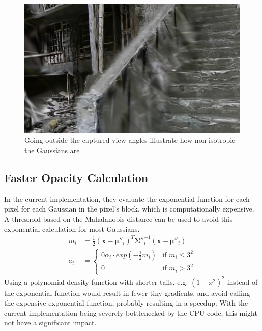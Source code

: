 \begin{figure}
    \centering
    \includegraphics[width=\linewidth]{images/very_isotropic.png}
    \caption{Going outside the captured view angles illustrate how non-isotropic the Gaussians are \cite{@nekoHashimaIslandCreated2023}}
    \label{fig:very_isotropic}
\end{figure}

\subsection{Faster Opacity Calculation}
In the current implementation, they evaluate the exponential function for each pixel for each Gaussian in the pixel's block, which is computationally expensive.
A threshold based on the Mahalanobis distance can be used to avoid this exponential calculation for most Gaussians.
\begin{align}
    m_i & =\frac{1}{2}(\bm{x}-\bm{\mu}''_i)^T \bm{\Sigma}{''}_i^{-1} (\bm{x}-\bm{\mu}''_i) \\
    a_i & =\begin{cases}
               0 \alpha_i \cdot exp(-\frac{1}{2}m_i) & \text{if } m_i \leq 3^2 \\
               0                                     & \text{if } m_i  > 3^2
           \end{cases}
\end{align}
Using a polynomial density function with shorter tails, e.g. $(1-x^2)^2$ instead of the exponential function would result in fewer tiny gradients, and avoid calling the expensive exponential function, probably resulting in a speedup.
With the current implementation being severely bottlenecked by the CPU code, this might not have a significant impact.



